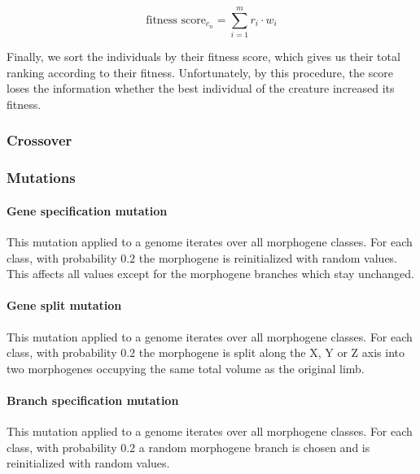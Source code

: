 \documentclass[main]{subfiles}
\begin{document}
\[\text{fitness score}_{c_n} = \sum\limits^m_{i=1} r_i \cdot w_i \]

Finally, we sort the individuals by their fitness score, which gives us their total ranking according to their fitness. Unfortunately, by this procedure, the score loses the information whether the best individual of the creature increased its fitness. 


\subsubsection{Crossover}
\label{subsec:crossover}

\lipsum[14]


\subsubsection{Mutations}


\paragraph{Gene specification mutation}

This mutation applied to a genome iterates over all morphogene classes. For each class, with probability $0.2$ the morphogene is reinitialized with random values. This affects all values except for the morphogene branches which stay unchanged.

\paragraph{Gene split mutation}

This mutation applied to a genome iterates over all morphogene classes. For each class, with probability $0.2$ the morphogene is split along the X, Y or Z axis into two morphogenes occupying the same total volume as the original limb.

\paragraph{Branch specification mutation}

This mutation applied to a genome iterates over all morphogene classes. For each class, with probability $0.2$ a random morphogene branch is chosen and is reinitialized with random values. 
\end{document}
